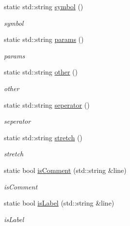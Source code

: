 \begin{DoxyCompactItemize}
\item 
static std\-::string \hyperlink{class_a_p_i2_1_1_h_e_l_p_e_r_1_1_user_params_reader_a284f4e73b5804e87d88ebfe75efe3274}{symbol} ()
\begin{DoxyCompactList}\small\item\em symbol \end{DoxyCompactList}\item 
static std\-::string \hyperlink{class_a_p_i2_1_1_h_e_l_p_e_r_1_1_user_params_reader_a9908944d6e59a34209e3b19a81c79d14}{params} ()
\begin{DoxyCompactList}\small\item\em params \end{DoxyCompactList}\item 
static std\-::string \hyperlink{class_a_p_i2_1_1_h_e_l_p_e_r_1_1_user_params_reader_ad2ba3f31a23e638bbf8a3cb460da482a}{other} ()
\begin{DoxyCompactList}\small\item\em other \end{DoxyCompactList}\item 
static std\-::string \hyperlink{class_a_p_i2_1_1_h_e_l_p_e_r_1_1_user_params_reader_a044af59e42c96afb5b6398dc8388cb64}{seperator} ()
\begin{DoxyCompactList}\small\item\em seperator \end{DoxyCompactList}\item 
static std\-::string \hyperlink{class_a_p_i2_1_1_h_e_l_p_e_r_1_1_user_params_reader_ae954ab9d0f69225be834a128a58528a7}{stretch} ()
\begin{DoxyCompactList}\small\item\em stretch \end{DoxyCompactList}\item 
static bool \hyperlink{class_a_p_i2_1_1_h_e_l_p_e_r_1_1_user_params_reader_a4eedd1ad207f29644547c574f179b872}{is\-Comment} (std\-::string \&line)
\begin{DoxyCompactList}\small\item\em is\-Comment \end{DoxyCompactList}\item 
static bool \hyperlink{class_a_p_i2_1_1_h_e_l_p_e_r_1_1_user_params_reader_a0502667a8dbaa76155f919f697d8bff0}{is\-Label} (std\-::string \&line)
\begin{DoxyCompactList}\small\item\em is\-Label \end{DoxyCompactList}\item 

\end{DoxyCompactItemize}
